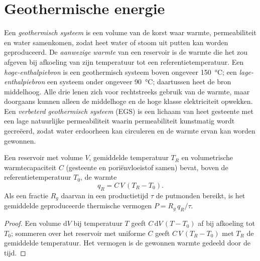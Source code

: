 \section{Geothermische energie}\label{sec:b2:energy-geology:geothermal}

\begin{definition}\label{def:b2:energy-geology:geothermal}
Een \emph{geothermisch systeem} is een volume van de korst waar warmte,
permeabiliteit en water samenkomen, zodat heet water of stoom uit putten kan worden geproduceerd. De
\emph{aanwezige warmte} van een reservoir is de warmte die het zou afgeven bij afkoeling
van zijn temperatuur tot een referentietemperatuur. Een \emph{hoge-enthalpiebron}
is een geothermisch systeem boven ongeveer \qty{150}{\celsius}; een
\emph{lage-enthalpiebron} een systeem onder ongeveer \qty{90}{\celsius}; daartussen heet de
bron middelhoog. Alle drie lenen zich voor rechtstreeks gebruik van de warmte, maar doorgaans kunnen alleen de middelhoge
en de hoge klasse elektriciteit opwekken. Een \emph{verbeterd geothermisch systeem} (EGS) is een lichaam van
heet gesteente met een lage natuurlijke permeabiliteit waarin permeabiliteit kunstmatig wordt gecreëerd, zodat water
erdoorheen kan circuleren en de warmte ervan kan worden gewonnen.
\end{definition}

\begin{proposition}\label{prop:b2:energy-geology:heat}
Een reservoir met volume $V$, gemiddelde temperatuur $T_R$ en volumetrische warmtecapaciteit $C$ (gesteente en
poriënvloeistof samen) bevat, boven de referentietemperatuur $T_0$, de warmte
\begin{equation}
q_R = C\,V\,(T_R - T_0) .
\label{eq:b2:energy-geology:heat}
\end{equation}
Als een fractie $R_g$ daarvan in een productietijd $\tau$ de putmonden bereikt, is het gemiddelde geproduceerde thermische
vermogen $P = R_g\,q_R/\tau$.
\end{proposition}

\begin{proof}
Een volume $\mathrm{d}V$ bij temperatuur $T$ geeft $C\,\mathrm{d}V\,(T - T_0)$ af bij afkoeling tot $T_0$;
sommeren over het reservoir met uniforme $C$ geeft $C\,V\,(T_R - T_0)$ met $T_R$ de gemiddelde
temperatuur. Het vermogen is de gewonnen warmte gedeeld door de tijd.
\end{proof}

